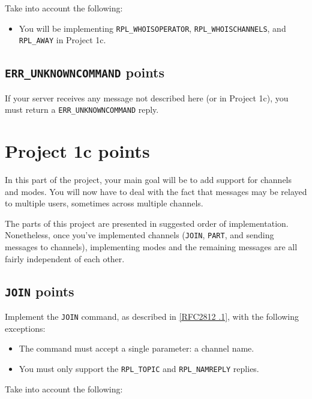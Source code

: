 \documentclass[10pt]{article}
\newcommand{\RFCsection}[2]{\href{http://tools.ietf.org/html/rfc#1\#section-#2}{[RFC#1 \textsection #2]}}
\newcommand{\points}[1]{{\sffamily\mdseries\guillemotleft #1 points\guillemotright{}}}
\begin{document}
\noindent Take into account the following:

\begin{itemize}
\item You will be implementing \texttt{RPL\_WHOISOPERATOR}, \texttt{RPL\_WHOISCHANNELS}, and \texttt{RPL\_AWAY} in Project 1c.
\end{itemize}

\subsection{\texttt{ERR\_UNKNOWNCOMMAND} \points{2.5}}

If your server receives any message not described here (or in Project 1c), you must return a \texttt{ERR\_UNKNOWNCOMMAND} reply.

\pagebreak

\section{Project 1c \points{100}}
\label{sec:proj1c}

In this part of the project, your main goal will be to add support for channels and modes. You will now have to deal with the fact that messages may be relayed to multiple users, sometimes across multiple channels. 

The parts of this project are presented in suggested order of implementation. Nonetheless, once you've implemented channels (\texttt{JOIN}, \texttt{PART}, and sending messages to channels), implementing modes and the remaining messages are all fairly independent of each other.

\subsection{\texttt{JOIN} \points{15}}

Implement the \texttt{JOIN} command, as described in \RFCsection{2812}{3.2.1}, with the following exceptions:

\begin{itemize}
\item The command must accept a single parameter: a channel name.
\item You must only support the \texttt{RPL\_TOPIC} and \texttt{RPL\_NAMREPLY} replies.
\end{itemize}

\noindent Take into account the following:
\end{document}
